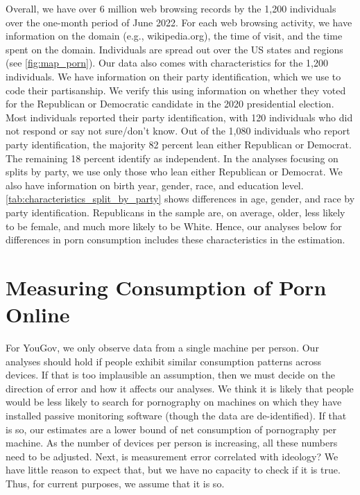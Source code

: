 \documentclass[12pt, letterpaper]{article}
\begin{document}
Overall, we have over 6 million web browsing records by the 1,200 individuals over the one-month period of June 2022. 
For each web browsing activity, we have information on the domain (e.g., wikipedia.org), the time of visit, and the time spent on the domain. Individuals are spread out over the US states and regions (see \cref{fig:map_porn}). 
Our data also comes with characteristics for the 1,200 individuals.
We have information on their party identification, which we use to code their partisanship.
We verify this using information on whether they voted for the Republican or Democratic candidate in the 2020 presidential election.
Most individuals reported their party identification, with 120 individuals who did not respond or say not sure/don't know.
Out of the 1,080 individuals who report party identification, the majority 82 percent lean either Republican or Democrat. The remaining 18 percent identify as independent.
In the analyses focusing on splits by party, we use only those who lean either Republican or Democrat.
We also have information on birth year, gender, race, and education level.
\cref{tab:characteristics_split_by_party} shows differences in age, gender, and race by party identification.
Republicans in the sample are, on average, older, less likely to be female, and much more likely to be White.
Hence, our analyses below for differences in porn consumption includes these characteristics in the estimation.




\section*{Measuring Consumption of Porn Online}
For YouGov, we only observe data from a single machine per person. Our analyses should hold if people exhibit similar consumption patterns across devices. If that is too implausible an assumption, then we must decide on the direction of error and how it affects our analyses. We think it is likely that people would be less likely to search for pornography on machines on which they have installed passive monitoring software (though the data are de-identified). If that is so, our estimates are a lower bound of net consumption of pornography per machine. As the number of devices per person is increasing, all these numbers need to be adjusted. Next, is measurement error correlated with ideology? We have little reason to expect that, but we have no capacity to check if it is true. Thus, for current purposes, we assume that it is so.  
\end{document}
